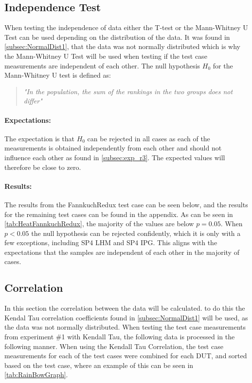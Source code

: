 

\subsection{Independence Test}\label{subsec:independence1}

When testing the independence of data either the T-test or the Mann-Whitney U Test can be used depending on the distribution of the data. It was found in \cref{subsec:NormalDist1}, that the data was not normally distributed which is why the Mann-Whitney U Test will be used when testing if the test case measurements are independent of each other. The null hypothesis $H_0$ for the Mann-Whitney U test is defined as:

\begin{quote}
    \textit{"In the population, the sum of the rankings in the two groups does not differ"}\cite*[]{mann1947test}
\end{quote}

\paragraph{Expectations:} The expectation is that $H_0$ can be rejected in all cases as each of the measurements is obtained independently from each other and should not influence each other as found in \cref{subsec:exp_r3}. The expected values will therefore be close to zero.

\paragraph{Results:}
The results from the FannkuchRedux test case can be seen below, and the results for the remaining test cases can be found in the appendix. As can be seen in \cref{tab:HeatFannkuchRedux}, the majority of the values are below $p = 0.05$. When $p < 0.05$ the null hypothesis can be rejected confidently, which it is only with a few exceptions, including SP4 LHM and SP4 IPG. This aligns with the expectations that the samples are independent of each other in the majority of cases.

 

\subsection{Correlation}\label{subsec:correlation1}
In this section the correlation between the data will be calculated. to do this the Kendal Tau correlation coefficients found in \cref{subsec:NormalDist1} will be used, as the data was not normally distributed. When testing the test case measurements from experiment \#1 with Kendall Tau, the following data is processed in the following manner. When using the Kendall Tau Correlation, the test case measurements for each of the test cases were combined for each DUT, and sorted based on the test case, where an example of this can be seen in \cref{tab:RainBowGraph}.

